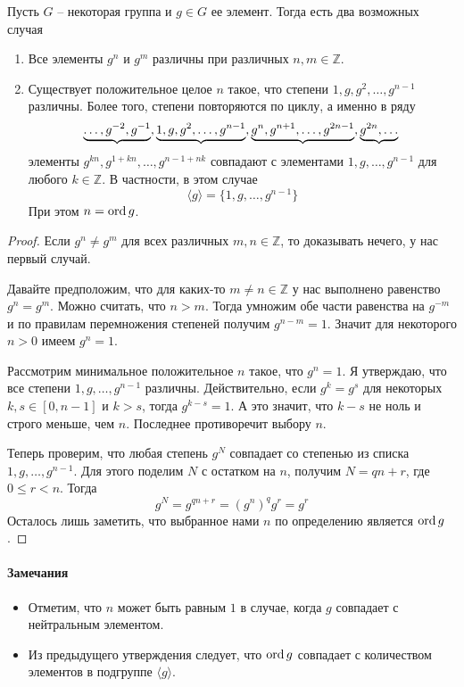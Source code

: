 \begin{claim}
\label{claim::CyclicClass}
Пусть $G$ -- некоторая группа и $g\in G$ ее элемент.
Тогда есть два возможных случая
\begin{enumerate}
\item Все элементы $g^n$ и $g^m$ различны при различных $n,m\in \mathbb Z$.

\item Существует положительное целое $n$ такое, что степени $1, g, g^2, \ldots, g^{n-1}$ различны.
Более того, степени повторяются по циклу, а именно в ряду
\[
\underbrace{\ldots, g^{-2},g^{-1}},\underbrace{1, g, g^2, \ldots, g^{n-1}}, \underbrace{g^n, g^{n+1},\ldots,g^{2n - 1}}, \underbrace{g^{2n},\ldots}\\
\]
элементы $g^{kn}, g^{1 + kn}, \ldots, g^{n-1 + nk}$ совпадают с элементами $1, g, \ldots, g^{n-1}$ для любого $k\in \mathbb Z$.
В частности, в этом случае
\[
\langle g\rangle =\{1,g,\ldots, g^{n-1}\}
\]
При этом $n = \operatorname{ord} g$.
\end{enumerate}
\end{claim}
\begin{proof}
Если $g^n \neq g^m$ для всех различных $m, n\in \mathbb Z$, то доказывать нечего, у нас первый случай.

Давайте предположим, что для каких-то $m\neq n\in \mathbb Z$ у нас выполнено равенство $g^n = g^m$.
Можно считать, что $n > m$.
Тогда умножим обе части равенства на $g^{-m}$ и по правилам перемножения степеней получим $g^{n-m} = 1$.
Значит для некоторого $n > 0$ имеем $g^n = 1$.

Рассмотрим минимальное положительное $n$ такое, что $g^n = 1$.
Я утверждаю, что все степени $1, g, \ldots, g^{n-1}$ различны.
Действительно, если $g^k = g^s$ для некоторых $k,s \in [0, n-1]$ и $k > s$, тогда $g^{k-s} = 1$.
А это значит, что $k - s$ не ноль и строго меньше, чем $n$.
Последнее противоречит выбору $n$.

Теперь проверим, что любая степень $g^N$ совпадает со степенью из списка  $1, g, \ldots, g^{n-1}$.
Для этого поделим $N$ с остатком на $n$, получим $N = qn + r$, где $0 \leqslant r < n$.
Тогда
\[
g^N = g^{qn + r} = (g^n)^q g^r = g^r
\]
Осталось лишь заметить, что выбранное нами $n$ по определению является $\operatorname{ord} g$.
\end{proof}

\paragraph{Замечания}

\begin{itemize}
\item Отметим, что $n$ может быть равным $1$ в случае, когда $g$ совпадает с нейтральным элементом.

\item Из предыдущего утверждения следует, что $\operatorname{ord} g$ совпадает с количеством элементов в подгруппе $\langle g \rangle$.

\end{itemize}

